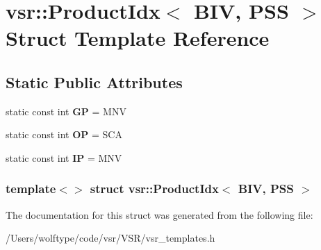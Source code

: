 \hypertarget{structvsr_1_1_product_idx_3_01_b_i_v_00_01_p_s_s_01_4}{\section{vsr\-:\-:Product\-Idx$<$ B\-I\-V, P\-S\-S $>$ Struct Template Reference}
\label{structvsr_1_1_product_idx_3_01_b_i_v_00_01_p_s_s_01_4}
}
\subsection*{Static Public Attributes}
\begin{DoxyCompactItemize}
\item 
\hypertarget{structvsr_1_1_product_idx_3_01_b_i_v_00_01_p_s_s_01_4_aca0d12b29feda6ad078a3db4514f4f8d}{static const int {\bfseries G\-P} = M\-N\-V}\label{structvsr_1_1_product_idx_3_01_b_i_v_00_01_p_s_s_01_4_aca0d12b29feda6ad078a3db4514f4f8d}

\item 
\hypertarget{structvsr_1_1_product_idx_3_01_b_i_v_00_01_p_s_s_01_4_a7c80d627f447c0e970bccbc2b1a0bc05}{static const int {\bfseries O\-P} = S\-C\-A}\label{structvsr_1_1_product_idx_3_01_b_i_v_00_01_p_s_s_01_4_a7c80d627f447c0e970bccbc2b1a0bc05}

\item 
\hypertarget{structvsr_1_1_product_idx_3_01_b_i_v_00_01_p_s_s_01_4_aed24b61d1cf778aa6c266e1ac8dd1d5d}{static const int {\bfseries I\-P} = M\-N\-V}\label{structvsr_1_1_product_idx_3_01_b_i_v_00_01_p_s_s_01_4_aed24b61d1cf778aa6c266e1ac8dd1d5d}

\end{DoxyCompactItemize}
\subsubsection*{template$<$$>$ struct vsr\-::\-Product\-Idx$<$ B\-I\-V, P\-S\-S $>$}



The documentation for this struct was generated from the following file\-:\begin{DoxyCompactItemize}
\item 
/\-Users/wolftype/code/vsr/\-V\-S\-R/vsr\-\_\-templates.\-h\end{DoxyCompactItemize}
